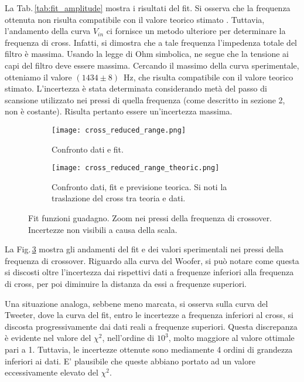 \documentclass[../Relazione_circuiti]{subfiles}
\begin{document}
  La Tab.\,\ref{tab:fit_amplitude} mostra i risultati del fit.
  Si osserva che la frequenza ottenuta non risulta compatibile con il valore teorico stimato \theoryF.
  Tuttavia, l'andamento della curva $V_{in}$ ci fornisce un metodo ulteriore per determinare la frequenza di cross.
  Infatti, si dimostra che a tale frequenza l'impedenza totale del filtro è massima.
  Usando la legge di Ohm simbolica, ne segue che la tensione ai capi del filtro deve essere massima.
  Cercando il massimo della curva sperimentale, otteniamo il valore $(1434 \pm 8)$~Hz, che risulta compatibile con il
  valore teorico stimato.
  L'incertezza è stata determinata considerando metà del passo di scansione utilizzato nei pressi di quella frequenza
  (come descritto in sezione 2, non è costante).
  Risulta pertanto essere un'incertezza massima.

  \begin{figure}[H]
    \centering

    \begin{subfigure}[t]{=0.49\textwidth}
        \texttt{[image: cross\_reduced\_range.png]}
        \caption{Confronto dati e fit.}
        \label{fig: amp_gain_fit_data_reduced}

    \end{subfigure}
    \hfill
    \begin{subfigure}[t]{=0.49\textwidth}
        \texttt{[image: cross\_reduced\_range\_theoric.png]}
    	\caption{Confronto dati, fit e previsione teorica. Si noti la traslazione del cross tra teoria e dati.}
    	\label{fig: amp_gain_fit_theoric_reduced}
    \end{subfigure}

    	\caption{Fit funzioni guadagno. Zoom nei pressi della frequenza di crossover. 		Incertezze non visibili a causa della scala.}
    	\label{fig: amp_gain_fit_reduced}


  \end{figure}

  La Fig.\,\ref{fig: amp_gain_fit_reduced} mostra gli andamenti del fit e dei valori sperimentali nei pressi della frequenza di crossover.
  Riguardo alla curva del Woofer, si può notare come questa si discosti oltre l'incertezza dai rispettivi dati a frequenze inferiori alla frequenza di cross, per poi diminuire la distanza da essi a frequenze superiori.

  Una situazione analoga, sebbene meno marcata, si osserva sulla curva del Tweeter, dove la curva del fit, entro le incertezze a frequenza inferiori al cross, si discosta progressivamente dai dati reali a frequenze superiori.
  Questa discrepanza è evidente nel valore del $\chi^2$, nell'ordine di $10^3$, molto maggiore al valore ottimale pari a 1. 
  Tuttavia, le incertezze ottenute sono mediamente 4 ordini di grandezza inferiori ai dati. E' plausibile che queste abbiano portato ad un valore eccessivamente elevato del $\chi^2$.
  
\end{document}
